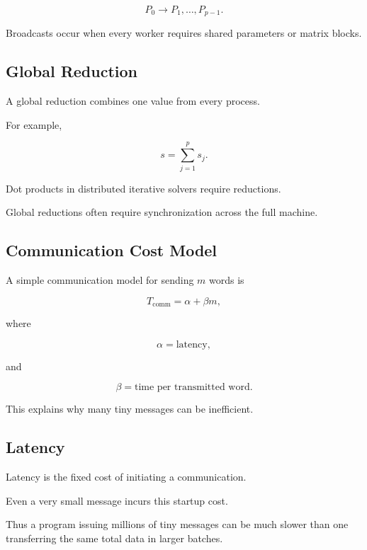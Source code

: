 \[
\boxed{
P_0
\longrightarrow
P_1,\ldots,P_{p-1}.
}
\]

Broadcasts occur when every worker requires shared parameters or matrix
blocks.

\subsection{Global Reduction}
\label{subsec:hpmc-global-reduction}

A global reduction combines one value from every process.

For example,

\[
\boxed{
s
=
\sum_{j=1}^{p}
s_j.
}
\]

Dot products in distributed iterative solvers require reductions.

Global reductions often require synchronization across the full machine.

\subsection{Communication Cost Model}
\label{subsec:hpmc-communication-model}

A simple communication model for sending \(m\) words is

\[
\boxed{
T_{\mathrm{comm}}
=
\alpha+\beta m,
}
\]

where

\[
\alpha
=
\text{latency},
\]

and

\[
\beta
=
\text{time per transmitted word}.
\]

This explains why many tiny messages can be inefficient.

\subsection{Latency}
\label{subsec:hpmc-latency}

Latency is the fixed cost of initiating a communication.

Even a very small message incurs this startup cost.

Thus a program issuing millions of tiny messages can be much slower than
one transferring the same total data in larger batches.

